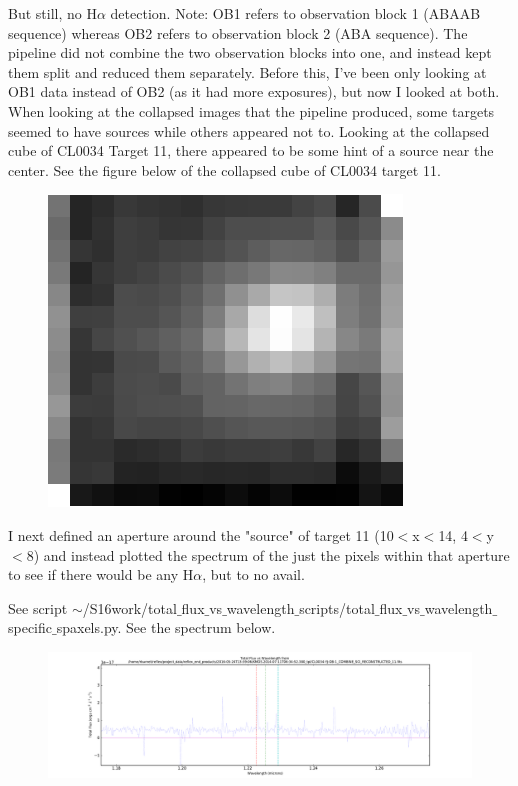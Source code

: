 \documentclass[10pt,letterpaper]{article}
\begin{document}
But still, no H$\alpha$ detection. Note: OB1 refers to observation block 1 (ABAAB sequence) whereas OB2 refers to observation block 2 (ABA sequence). The pipeline did not combine the two observation blocks into one, and instead kept them split and reduced them separately. Before this, I've been only looking at OB1 data instead of OB2 (as it had more exposures), but now I looked at both.\\

When looking at the collapsed images that the pipeline produced, some targets seemed to have sources while others appeared not to. Looking at the collapsed cube of CL0034 Target 11, there appeared to be some hint of a source near the center. See the figure below of the collapsed cube of CL0034 target 11.\\

\begin{figure}[h!]
\includegraphics[scale=0.4]{figures/CL0034_target_11_OB1_collapsed.png}
\end{figure}

I next defined an aperture around the "source" of target 11 (10$<$x$<$14, 4$<$y$<$8) and instead plotted the spectrum of the just the pixels within that aperture to see if there would be any H$\alpha$, but to no avail. 

See script $\sim$/S16work/total$\_$flux$\_$vs$\_$wavelength$\_$scripts/total$\_$flux$\_$vs$\_$wavelength$\_$specific$\_$spaxels.py. See the spectrum below. \\

\begin{figure}[h!]
\includegraphics[scale=0.4]{figures/CL0034-YJ-OB-1_COMBINE_SCI_RECONSTRUCTED_11_specific_spaxels.pdf}
\end{figure}
\end{document}
